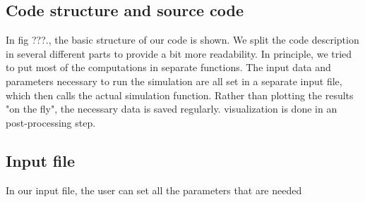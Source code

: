 \documentclass[11pt]{article}
\begin{document}
\begin{appendix}
\section{Code structure and source code}
In fig ???., the basic structure of our code is shown. We split the code description in several different parts to provide a bit more readability. In principle, we tried to put most of the computations in separate functions. The input data and parameters necessary to run the simulation are all set in a separate input file, which then calls the actual simulation function. Rather than plotting the results "on the fly", the necessary data is saved regularly. visualization is done in an post-processing step.
\subsection{Input file}
In our input file, the user can set all the parameters that are needed

\end{appendix}
\end{document}
